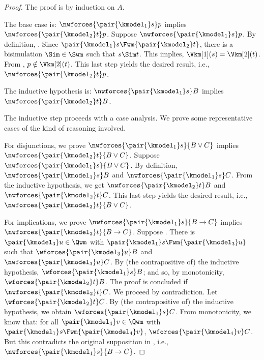 \begin{proof}
    \setcounter{ieqnnum}{0}
    The proof is by induction on $A$.

    \medskip
    \noindent
    The base case is: $\nwforces {\pair {\kmodel_1} s} p$ implies $\nwforces {\pair {\kmodel_2} t} p$.
    Suppose ${\nwforces {\pair {\kmodel_1} s} p}$.
    By definition, .
    Since ${\pair {\kmodel_1} s} \Fwm {\pair {\kmodel_2} t}$, there is a bisimulation $\Sim \in \Swm$ such that $s \Sim t$.
    This implies, $\Vkm[1](s) = \Vkm[2](t)$.
    From , $p \notin \Vkm[2](t)$.
    This last step yields the desired result, i.e., $\nwforces {\pair {\kmodel_2} t} p$.

    \medskip
    \noindent
    The inductive hypothesis is: $\nwforces {\pair {\kmodel_1} s} B$ implies $\nwforces {\pair {\kmodel_2} t} B$.

    \medskip
    \noindent
    The inductive step proceeds with a case analysis.
    We prove some representative cases of the kind of reasoning involved.

    \medskip
    \noindent
    For disjunctions, we prove $\nwforces {\pair {\kmodel_1} s} {B \lor C}$ implies $\nwforces {\pair {\kmodel_2} t} {B \lor C}$.
    Suppose $\nwforces {\pair {\kmodel_1} s} {B \lor C}$.
    By definition, $\nwforces {\pair {\kmodel_1} s} B$ and $\nwforces {\pair {\kmodel_1} s} C$.
    From the inductive hypothesis, we get $\nwforces {\pair {\kmodel_2} t} B$ and ${\nwforces {\pair {\kmodel_2} t} C}$.
    This last step yields the desired result, i.e., $\nwforces {\pair {\kmodel_2} t} {B \lor C}$.

    \medskip
    \noindent
    For implications, we prove $\nwforces {\pair {\kmodel_1} s} {B \to C}$ implies $\nwforces {\pair {\kmodel_2} t} {B \to C}$.
    Suppose
        .
    There is ${\pair {\kmodel_3} u} \in \Qwm$ with ${\pair {\kmodel_1} s} \Fwm {\pair {\kmodel_3} u}$ such that
        $\wforces {\pair {\kmodel_3} u} B$ and $\nwforces {\pair {\kmodel_3} u} C$.
    By (the contrapositive of) the inductive hypothesis, $\wforces {\pair {\kmodel_1} s} B$; and so, by monotonicity, ${\wforces {\pair {\kmodel_2} t} B}$.
    The proof is concluded if $\nwforces {\pair {\kmodel_2} t} C$.
    We proceed by contradiction.
    Let $\wforces {\pair {\kmodel_2} t} C$.
    By (the contrapositive of) the inductive hypothesis, we obtain ${\wforces {\pair {\kmodel_1} s} C}$.
    From monotonicity, we know that: for all ${{\pair {\kmodel_4} v} \in \Qwm}$ with ${\pair {\kmodel_1} s} \Fwm {\pair {\kmodel_4} v}$, $\wforces {\pair {\kmodel_4} v} C$.
    But this contradicts the original supposition in , i.e., $\nwforces {\pair {\kmodel_1} s} {B \to C}$.


\end{proof}
